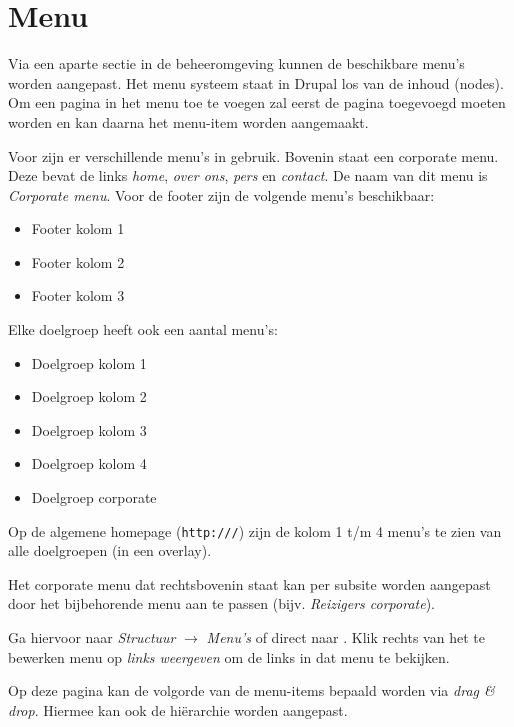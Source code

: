 \section{Menu}\label{menu}
Via een aparte sectie in de beheeromgeving kunnen de beschikbare menu's worden aangepast. Het menu systeem staat in Drupal los van de inhoud (nodes). Om een pagina in het menu toe te voegen zal eerst de pagina toegevoegd moeten worden en kan daarna het menu-item worden aangemaakt.

Voor \customerdomain  zijn er verschillende menu's in gebruik. Bovenin staat een corporate menu. Deze bevat de links \emph{home}, \emph{over ons}, \emph{pers} en \emph{contact}. De naam van dit menu is \emph{Corporate menu}. Voor de footer zijn de volgende menu's beschikbaar:
\begin{itemize}
\item Footer kolom 1
\item Footer kolom 2
\item Footer kolom 3
\end{itemize}
Elke doelgroep heeft ook een aantal menu's:
\begin{itemize}
\item Doelgroep kolom 1
\item Doelgroep kolom 2
\item Doelgroep kolom 3
\item Doelgroep kolom 4
\item Doelgroep corporate
\end{itemize}
Op de algemene homepage (\texttt{http://\customerdomain /}) zijn de kolom 1 t/m 4 menu's te zien van alle doelgroepen (in een overlay).

Het corporate menu dat rechtsbovenin staat kan per subsite worden aangepast door het bijbehorende menu aan te passen (bijv. \emph{Reizigers corporate}).

Ga hiervoor naar \emph{Structuur} $\rightarrow$ \emph{Menu's} of direct naar . Klik rechts van het te bewerken menu op \emph{links weergeven} om de links in dat menu te bekijken.

Op deze pagina kan de volgorde van de menu-items bepaald worden via \emph{drag \& drop}. Hiermee kan ook de hi\"{e}rarchie worden aangepast.

